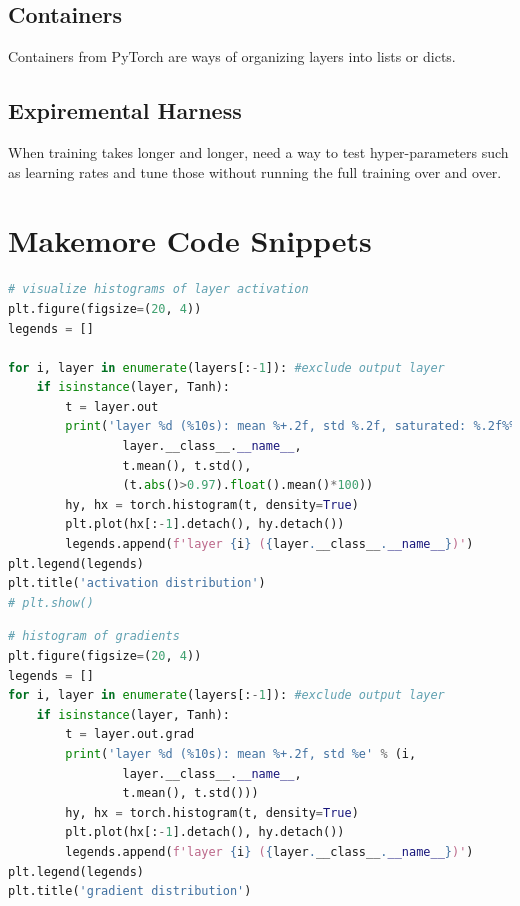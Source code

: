 \documentclass{article}
\begin{document}
\subsection*{Containers}
Containers from PyTorch are ways of organizing layers into lists or dicts.  

\subsection*{Expiremental Harness}
When training takes longer and longer, need a way to test hyper-parameters such as learning rates and tune those without running the full training over and over.

\section*{Makemore Code Snippets}
\begin{lstlisting}[language=Python, caption={Activation graph with matplotlib}, label={code:activation-graph}]    
# visualize histograms of layer activation
plt.figure(figsize=(20, 4))
legends = []

for i, layer in enumerate(layers[:-1]): #exclude output layer
    if isinstance(layer, Tanh):
        t = layer.out 
        print('layer %d (%10s): mean %+.2f, std %.2f, saturated: %.2f%%' % (i, 
                layer.__class__.__name__, 
                t.mean(), t.std(), 
                (t.abs()>0.97).float().mean()*100))
        hy, hx = torch.histogram(t, density=True)
        plt.plot(hx[:-1].detach(), hy.detach())
        legends.append(f'layer {i} ({layer.__class__.__name__})')
plt.legend(legends)
plt.title('activation distribution')
# plt.show()
\end{lstlisting}

\begin{lstlisting}[language=Python, caption={Gradients of $\tanh$ layers with matplotlib}, label={code:grad-graph}]
    # histogram of gradients
plt.figure(figsize=(20, 4))
legends = []
for i, layer in enumerate(layers[:-1]): #exclude output layer
    if isinstance(layer, Tanh):
        t = layer.out.grad
        print('layer %d (%10s): mean %+.2f, std %e' % (i, 
                layer.__class__.__name__, 
                t.mean(), t.std()))
        hy, hx = torch.histogram(t, density=True)
        plt.plot(hx[:-1].detach(), hy.detach())
        legends.append(f'layer {i} ({layer.__class__.__name__})')
plt.legend(legends)
plt.title('gradient distribution')
\end{lstlisting}
\end{document}
